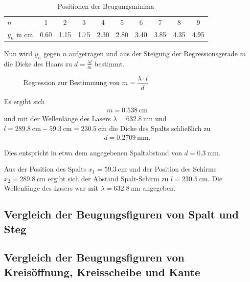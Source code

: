 \documentclass[ngerman, parskip*]{scrartcl}
\begin{document}
\begin{table}[!h]
\centering
\caption{Positionen der Beugungsminima}
\begin{tabular}{l|ccccccccc}
\toprule
$n$ & 1 & 2 & 3 & 4 & 5 & 6 & 7 & 8 & 9 \\ 
$y_n$ in $\si{\cm}$ & 0.60 & 1.15 & 1.75 & 2.30 & 2.80 & 3.40 & 3.85 & 4.35 & 4.95 \\ 
\bottomrule
\end{tabular}
\label{table:2_1}
\end{table}

Nun wird $y_n$ gegen $n$ aufgetragen und aus der Steigung der Regressionsgerade $m$ die Dicke des Haars zu $d = \frac{\lambda l}{m}$ bestimmt.

\begin{figure}
  \centering
  \caption{Regression zur Bestimmung von $m = \dfrac{\lambda \cdot l}{d}$ }
  
\end{figure}

Es ergibt sich 
\begin{align*}
  m = \SI {0,538}{\cm}
\end{align*}
und mit der Wellenlänge des Lasers $\lambda = \SI{632,8}{\nano\meter}$ und $l = \SI{289,8}{\cm} - \SI{59,3}{\cm} = \SI{230,5}{\cm}$ die Dicke des Spalts schließlich zu
\begin{align*}
  d = \SI{0,2709}{\milli\meter}.
\end{align*}

Dies entspricht in etwa dem angegebenen Spaltabstand von $ d = \SI{0,3}{\milli\meter}$.




Aus der Position des Spalts $x_1 = \SI{59,3}{\cm}$ und der Position des Schirms $x_2 = \SI{289,8}{\cm}$ ergibt sich der Abstand Spalt-Schirm zu $l = \SI{230,5}{\cm}$. Die Wellenlänge des Lasers war mit $\lambda = \SI{632,8}{\nano\meter}$ angegeben. 

\subsection{Vergleich der Beugungsfiguren von Spalt und Steg}


\subsection{Vergleich der Beugungsfiguren von Kreisöffnung, Kreisscheibe und Kante }
\end{document}
